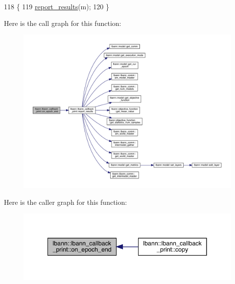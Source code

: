 \begin{DoxyCode}
118                                                 \{
119   \hyperlink{classlbann_1_1lbann__callback__print_a50117faa3edb961ddd87c5c5806820b2}{report\_results}(m);
120 \}
\end{DoxyCode}
Here is the call graph for this function\+:\nopagebreak
\begin{figure}[H]
\begin{center}
\leavevmode
\includegraphics[width=350pt]{classlbann_1_1lbann__callback__print_a28f2b022193c62f3af40364d2c5b14b2_cgraph}
\end{center}
\end{figure}
Here is the caller graph for this function\+:\nopagebreak
\begin{figure}[H]
\begin{center}
\leavevmode
\includegraphics[width=341pt]{classlbann_1_1lbann__callback__print_a28f2b022193c62f3af40364d2c5b14b2_icgraph}
\end{center}
\end{figure}
\mbox{\label{classlbann_1_1lbann__callback__print_a1f72a486004af859823f75c311dcff42}} 

